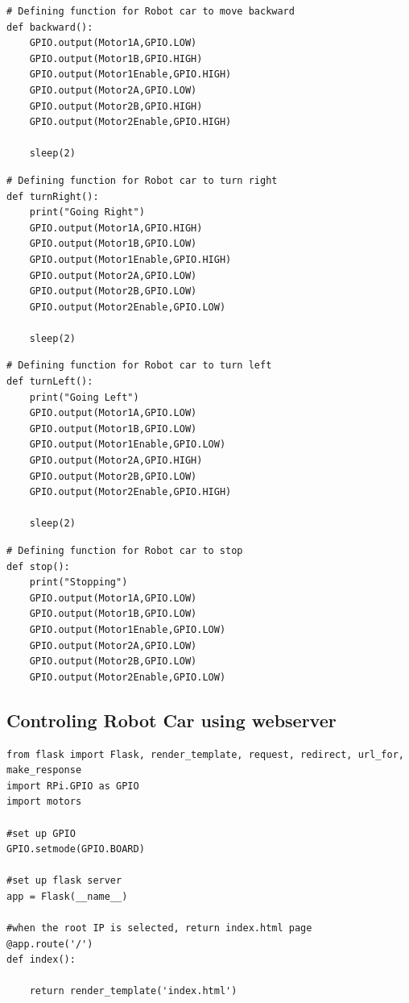 \documentclass[sigconf]{acmart}
\begin{document}
\begin{lstlisting}
# Defining function for Robot car to move backward
def backward():
	GPIO.output(Motor1A,GPIO.LOW)
	GPIO.output(Motor1B,GPIO.HIGH)
	GPIO.output(Motor1Enable,GPIO.HIGH)
	GPIO.output(Motor2A,GPIO.LOW)
	GPIO.output(Motor2B,GPIO.HIGH)
	GPIO.output(Motor2Enable,GPIO.HIGH)

	sleep(2)
\end{lstlisting}

\begin{lstlisting}
# Defining function for Robot car to turn right
def turnRight():
	print("Going Right")
	GPIO.output(Motor1A,GPIO.HIGH)
	GPIO.output(Motor1B,GPIO.LOW)
	GPIO.output(Motor1Enable,GPIO.HIGH)
	GPIO.output(Motor2A,GPIO.LOW)
	GPIO.output(Motor2B,GPIO.LOW)
	GPIO.output(Motor2Enable,GPIO.LOW)

	sleep(2)
\end{lstlisting}

\begin{lstlisting}
# Defining function for Robot car to turn left
def turnLeft():
	print("Going Left")
	GPIO.output(Motor1A,GPIO.LOW)
	GPIO.output(Motor1B,GPIO.LOW)
	GPIO.output(Motor1Enable,GPIO.LOW)
	GPIO.output(Motor2A,GPIO.HIGH)
	GPIO.output(Motor2B,GPIO.LOW)
	GPIO.output(Motor2Enable,GPIO.HIGH)

	sleep(2)
\end{lstlisting}

\begin{lstlisting}
# Defining function for Robot car to stop
def stop():
	print("Stopping")
	GPIO.output(Motor1A,GPIO.LOW)
	GPIO.output(Motor1B,GPIO.LOW)
	GPIO.output(Motor1Enable,GPIO.LOW)
	GPIO.output(Motor2A,GPIO.LOW)
	GPIO.output(Motor2B,GPIO.LOW)
	GPIO.output(Motor2Enable,GPIO.LOW)
\end{lstlisting}

\subsection{Controling Robot Car using webserver}
\begin{lstlisting}
from flask import Flask, render_template, request, redirect, url_for, make_response
import RPi.GPIO as GPIO
import motors

#set up GPIO
GPIO.setmode(GPIO.BOARD) 

#set up flask server
app = Flask(__name__) 

#when the root IP is selected, return index.html page
@app.route('/')
def index():

	return render_template('index.html')
\end{lstlisting}
\end{document}
